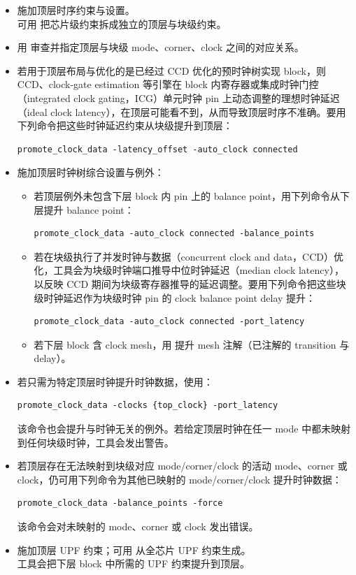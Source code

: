 \begin{itemize}
  \item 施加顶层时序约束与设置。\\
可用  把芯片级约束拆成独立的顶层与块级约束。

  \item 用  审查并指定顶层与块级 mode、corner、clock 之间的对应关系。

  \item 若用于顶层布局与优化的是已经过 CCD 优化的预时钟树实现 block，则 CCD、clock-gate estimation 等引擎在 block 内寄存器或集成时钟门控（integrated clock gating，ICG）单元时钟 pin 上动态调整的理想时钟延迟（ideal clock latency），在顶层可能看不到，从而导致顶层时序不准确。要用下列命令把这些时钟延迟约束从块级提升到顶层：
\begin{lstlisting}
promote_clock_data -latency_offset -auto_clock connected
\end{lstlisting}

  \item 施加顶层时钟树综合设置与例外：
  \begin{itemize}
    \item 若顶层例外未包含下层 block 内 pin 上的 balance point，用下列命令从下层提升 balance point：
\begin{lstlisting}
promote_clock_data -auto_clock connected -balance_points
\end{lstlisting}
    \item 若在块级执行了并发时钟与数据（concurrent clock and data，CCD）优化，工具会为块级时钟端口推导中位时钟延迟（median clock latency），以反映 CCD 期间为块级寄存器推导的延迟调整。要用下列命令把这些块级时钟延迟作为块级时钟 pin 的 clock balance point delay 提升：
\begin{lstlisting}
promote_clock_data -auto_clock connected -port_latency
\end{lstlisting}
    \item 若下层 block 含 clock mesh，用  提升 mesh 注解（已注解的 transition 与 delay）。
  \end{itemize}

  \item 若只需为特定顶层时钟提升时钟数据，使用：
\begin{lstlisting}
promote_clock_data -clocks {top_clock} -port_latency
\end{lstlisting}
该命令也会提升与时钟无关的例外。若给定顶层时钟在任一 mode 中都未映射到任何块级时钟，工具会发出警告。

  \item 若顶层存在无法映射到块级对应 mode/corner/clock 的活动 mode、corner 或 clock，仍可用下列命令为其他已映射的 mode/corner/clock 提升时钟数据：
\begin{lstlisting}
promote_clock_data -balance_points -force
\end{lstlisting}
该命令会对未映射的 mode、corner 或 clock 发出错误。

  \item 施加顶层 UPF 约束；可用  从全芯片 UPF 约束生成。\\
工具会把下层 block 中所需的 UPF 约束提升到顶层。
\end{itemize}

